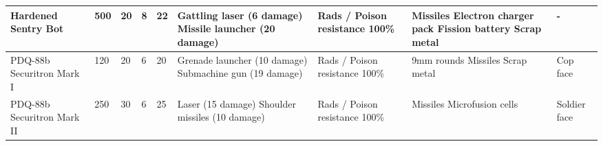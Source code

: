 \begin{longtable}{|p{2.3cm}|p{1cm}|p{1cm}|p{1cm}|p{1cm}|p{2.6cm}|p{2.6cm}|p{2.6cm}|p{2.6cm}|}
\hline
Hardened Sentry Bot & 500 & 20 & 8 & 22 & Gattling laser (6 damage) Missile launcher (20 damage) & Rads / Poison resistance 100\% & Missiles Electron charger pack Fission battery Scrap metal & - \\
\hline
PDQ-88b Securitron Mark I & 120 & 20 & 6 & 20 & Grenade launcher (10 damage) Submachine gun (19 damage) & Rads / Poison resistance 100\% & 9mm rounds Missiles Scrap metal & Cop face \\
\hline
PDQ-88b Securitron Mark II & 250 & 30 & 6 & 25 & Laser (15 damage) Shoulder missiles (10 damage) & Rads / Poison resistance 100\% & Missiles Microfusion cells & Soldier face \\
\hline
\end{longtable}
